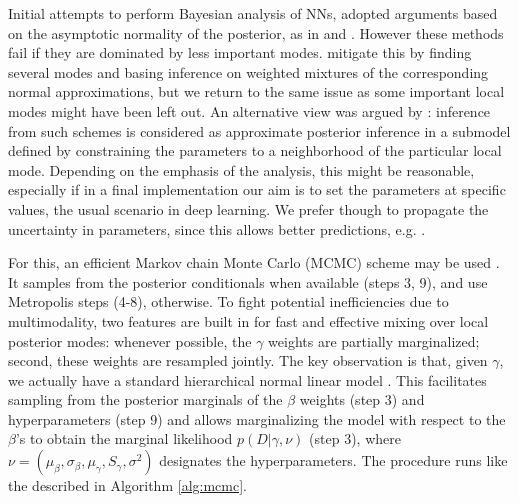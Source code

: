 Initial attempts to perform Bayesian analysis
of NNs, adopted
arguments based on the asymptotic normality of the posterior, 
as in  
\parencite{mckay} and \parencite{buntineweigend}. However these methods
fail if they are dominated by  
less important modes. %
 \parencite{buntineweigend} mitigate this by finding several modes and
basing inference on weighted mixtures of the corresponding normal approximations, but we return to the same issue as some
important local modes might have been left out. An alternative view was argued
by \parencite{mckay}: inference from such schemes is 
 considered as approximate
posterior inference in a submodel defined by constraining the
parameters to a neighborhood of the particular local mode. Depending on
the emphasis of the analysis, this might be reasonable, especially if in a final
implementation our aim is to set the parameters at specific values,
the usual scenario in deep learning. We prefer
though to propagate the uncertainty in parameters, since this allows
better predictions, e.g. \parencite{raftery}. 

For this, an efficient 
Markov chain Monte Carlo (MCMC) scheme
may be used \parencite{muller1998issues}. It 
 samples from the posterior conditionals when available (steps 3, 9), and use
Metropolis steps (4-8), otherwise. To fight potential inefficiencies due to
multimodality, two features are built in 
 for
fast and effective mixing over local posterior modes:
whenever
possible, the $\gamma$ weights are 
partially marginalized; second,
these weights are resampled jointly.
The key observation is that,
given
 $\gamma $,
we actually have a standard hierarchical normal linear
model \parencite{french}. This facilitates sampling from the posterior marginals of the $\beta $ weights (step 3)
 and hyperparameters (step 9) and 
 allows marginalizing the model with respect
 to the $\beta$'s
  to obtain the marginal likelihood $p(D|\gamma, \nu)$
  (step 3), where $\nu=(\mu_\beta,\sigma_\beta,\mu_\gamma,S_\gamma,\sigma^2)$ designates the hyperparameters.
The procedure runs like the described in Algorithm \ref{alg:mcmc}.

